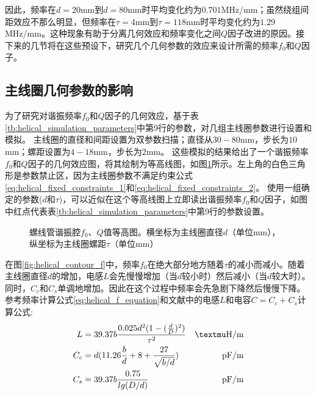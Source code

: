 因此，频率在$d=20 $mm到$d=80 $mm时平均变化约为$0.701$MHz/mm；虽然绕组间距效应不那么明显，但频率在$\tau=4 $mm到$\tau=118 $mm时平均变化约为$1.29$MHz/mm。这种现象有助于分离几何效应和频率变化之间$ Q $因子改进的原因。接下来的几节将在这些预设下，研究几个几何参数的效应来设计所需的频率$f_0$和$Q$因子。
\subsection[主线圈几何参数的影响]{主线圈几何参数的影响}

为了研究对谐振频率$f_0$和$Q$因子的几何效应，基于表\ref{tb:helical_simulation_parameters}中第9行的参数，对几组主线圈参数进行设置和模拟。
主线圈的直径和间距设置为双参数扫描；直径从$30-80$mm，步长为$10$mm；螺距设置为$4-18$mm，步长为$2$mm。
这些模拟的结果给出了一个谐振频率$f_0$和$Q$因子的几何效应图，将其绘制为等高线图，如图\ref{fig:helical_contour}所示。左上角的白色三角形是参数禁止区，因为主线圈参数不满足约束公式\eqref{eq:helical_fixed_constraints_1}和\eqref{eq:helical_fixed_constraints_2}。
使用一组确定的参数($d$和$\tau$)，可以近似在这个等高线图上立即读出谐振频率$f_0$和$Q$因子，如图中红点代表表\ref{tb:helical_simulation_parameters}中第9行的参数设置。

\begin{figure}
    \centering
    \caption[螺线管谐振腔$f_0$、$Q$值等高图]{螺线管谐振腔$f_0$、$Q$值等高图。横坐标为主线圈直径$d$（单位mm），纵坐标为主线圈螺距$\tau$（单位mm）\label{fig:helical_contour}}
\end{figure}

在图\ref{fig:helical_contour_f}中，频率$f_0$在绝大部分地方随着$\tau$的减小而减小。随着主线圈直径$d$的增加，电感$L$会先慢慢增加（当$d$较小时）然后减小（当$d$较大时）。同时，$C_c$和$C_s$单调地增加。因此在这个过程中频率会先急剧下降然后慢慢下降。参考频率计算公式\eqref{eq:helical_f_equation}和文献\cite[]{Siverns_Simkins_Weidt_Hensinger_2012,Macalpine_Schildknecht_1959}中的电感$L$和电容$C = C_c +C_s$计算公式:
\begin{align}
    L&=39.37b\frac{0.025d^2(1-(\frac{d}{D})^2)}{\tau^2} &\mu \textnormal{H/m} \label{eq:helical_L} \\
	C_c&=d(11.26\frac{b}{d}+8+\frac{27}{\sqrt{b/d}})  &\textnormal{pF/m} \label{eq:helical_C_c}\\
	C_s&=39.37b\frac{0.75}{lg(D/d)} &\textnormal{pF/m} \label{eq:helical_C_s}
\end{align}


